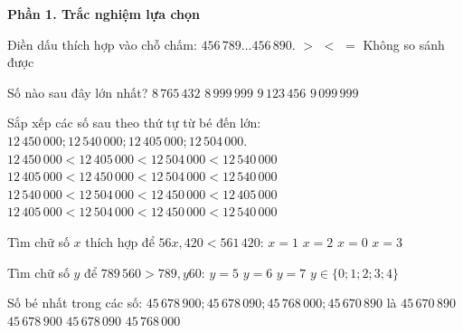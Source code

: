 \textbf{Phần 1. Trắc nghiệm lựa chọn}

\begin{ex} %
Điền dấu thích hợp vào chỗ chấm: $456\,789 \dots 456\,890$.
\choice
{$>$}
{\True $<$}
{$=$}
{Không so sánh được}
\end{ex}

\begin{ex} %
Số nào sau đây lớn nhất?
\choice
{$8\,765\,432$}
{$8\,999\,999$}
{\True $9\,123\,456$}
{$9\,099\,999$}
\end{ex}

\begin{ex} %
Sắp xếp các số sau theo thứ tự từ bé đến lớn: $12\,450\,000; 12\,540\,000; 12\,405\,000; 12\,504\,000$.
\choice
{$12\,450\,000 < 12\,405\,000 < 12\,504\,000 < 12\,540\,000$}
{\True $12\,405\,000 < 12\,450\,000 < 12\,504\,000 < 12\,540\,000$}
{$12\,540\,000 < 12\,504\,000 < 12\,450\,000 < 12\,405\,000$}
{$12\,405\,000 < 12\,504\,000 < 12\,450\,000 < 12\,540\,000$}
\end{ex}

\begin{ex} %
Tìm chữ số $x$ thích hợp để $56x,420 < 561\,420$:
\choice
{$x = 1$}
{$x = 2$}
{\True $x = 0$}
{$x = 3$}
\end{ex}

\begin{ex} %
Tìm chữ số $y$ để $789\,560 > 789,y60$:
\choice
{$y = 5$}
{$y = 6$}
{$y = 7$}
{\True $y \in \{0; 1; 2; 3; 4\}$}
\end{ex}

\begin{ex} %
Số bé nhất trong các số: $45\,678\,900; 45\,678\,090; 45\,768\,000; 45\,670\,890$ là
\choice
{\True $45\,670\,890$}
{$45\,678\,900$}
{$45\,678\,090$}
{$45\,768\,000$}
\end{ex}

